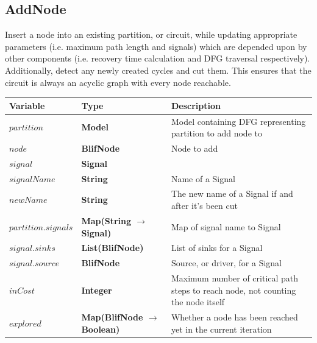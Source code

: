 \documentclass[12pt,final,oneside]{dwThesis} %
\begin{document}
   \subsection{AddNode}
   Insert a node into an existing partition, or
   circuit, while updating appropriate parameters (i.e. maximum path length and
   signals) which are depended upon by other components (i.e. recovery time
   calculation and \gls{DFG} traversal respectively).  Additionally, detect any
   newly created cycles and cut them.  This ensures that the circuit is always
   an acyclic graph with every node reachable.  
   \begin{algorithm}


      \begin{center}

         \begin{tabularx}
            {\linewidth}{llX} \toprule Variable & Type
            & Description\\
            \midrule $partition$ &\textbf{Model } &  Model
            containing DFG representing partition to add node to\\
            $node$
            &\textbf{BlifNode } &  Node to add\\
            $signal$ &\textbf{Signal
            } &  \\
            $signalName$ &\textbf{String } &  Name of a Signal\\

            $newName$ &\textbf{String } &  The new name of a Signal if and
            after it's been cut\\
            $partition.signals$ &\textbf{Map(String
               $\to$ Signal) } &  Map of signal name to Signal \\

            $signal.sinks$ &\textbf{List(BlifNode) } &  List of sinks for a
            Signal \\
            $signal.source$ &\textbf{BlifNode } &  Source, or
            driver, for a Signal \\
            $inCost$ &\textbf{Integer } &  Maximum
            number of critical path steps to reach node, not counting the node
            itself \\
            $explored$ &\textbf{Map(BlifNode $\to$ Boolean) } &
            Whether a node has been reached yet in the current iteration \\

            \bottomrule 
         \end{tabularx}


\end{center}
\end{algorithm}
\end{document}
